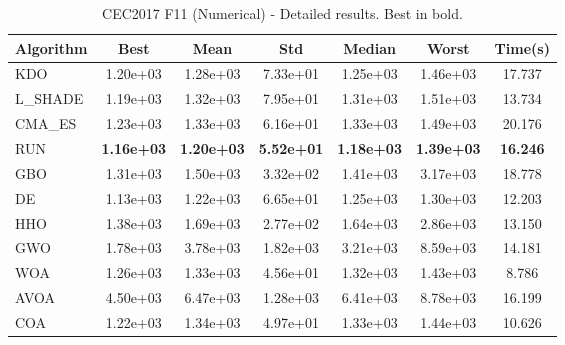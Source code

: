 \begin{table}[H]
\centering\small
\caption{CEC2017 F11 (Numerical) - Detailed results. Best in bold.}
\label{tab:cec2017_F11}
\begin{tabular}{lcccccc}
\toprule
\textbf{Algorithm} & \textbf{Best} & \textbf{Mean} & \textbf{Std} & \textbf{Median} & \textbf{Worst} & \textbf{Time(s)} \\
\midrule
KDO & 1.20e+03 & 1.28e+03 & 7.33e+01 & 1.25e+03 & 1.46e+03 & 17.737 \\
L_SHADE & 1.19e+03 & 1.32e+03 & 7.95e+01 & 1.31e+03 & 1.51e+03 & 13.734 \\
CMA_ES & 1.23e+03 & 1.33e+03 & 6.16e+01 & 1.33e+03 & 1.49e+03 & 20.176 \\
RUN & \textbf{1.16e+03} & \textbf{1.20e+03} & \textbf{5.52e+01} & \textbf{1.18e+03} & \textbf{1.39e+03} & \textbf{16.246} \\
GBO & 1.31e+03 & 1.50e+03 & 3.32e+02 & 1.41e+03 & 3.17e+03 & 18.778 \\
DE & 1.13e+03 & 1.22e+03 & 6.65e+01 & 1.25e+03 & 1.30e+03 & 12.203 \\
HHO & 1.38e+03 & 1.69e+03 & 2.77e+02 & 1.64e+03 & 2.86e+03 & 13.150 \\
GWO & 1.78e+03 & 3.78e+03 & 1.82e+03 & 3.21e+03 & 8.59e+03 & 14.181 \\
WOA & 1.26e+03 & 1.33e+03 & 4.56e+01 & 1.32e+03 & 1.43e+03 & 8.786 \\
AVOA & 4.50e+03 & 6.47e+03 & 1.28e+03 & 6.41e+03 & 8.78e+03 & 16.199 \\
COA & 1.22e+03 & 1.34e+03 & 4.97e+01 & 1.33e+03 & 1.44e+03 & 10.626 \\
\bottomrule
\end{tabular}
\end{table}
